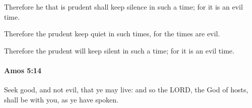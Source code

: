 			\begin{versebox}
					\item[BHS] 
					\item[LXX] 
					\item[ASV] Therefore he that is prudent shall keep silence in such a time; for it is an evil time.
					\item[NIV] Therefore the prudent keep quiet in such times, for the times are evil.
					\item[NRSV] Therefore the prudent will keep silent in such a time; for it is an evil time.
			\end{versebox}

		\paragraph{Amos 5:14} %
			\label{AMOS-5-14}

			Seek good, and not evil, that ye may live: and so the LORD, the God of hosts, shall be with you, as ye have spoken.

